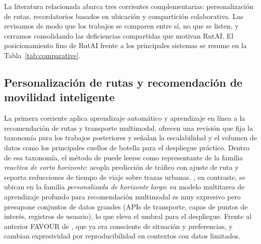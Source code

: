 \documentclass[a4paper,fleqn]{cas-sc}
\newcommand{\RUTAI}{RutAI\xspace}
\begin{document}
	La literatura relacionada abarca tres corrientes complementarias: personalizaci\'on de rutas, recordatorios basados en ubicaci\'on y compartici\'on colaborativa. Las revisamos de modo que los trabajos se comparen entre s\'i, no que se listen, y cerramos consolidando las deficiencias compartidas que motivan \RUTAI. El posicionamiento fino de \RUTAI frente a los principales sistemas se resume en la Tabla~\ref{tab:comparative}.
	
	\subsection{Personalizaci\'on de rutas y recomendaci\'on de movilidad inteligente}\label{sec:rw-routes}
	
	La primera corriente aplica aprendizaje autom\'atico y aprendizaje en l\'inea a la recomendaci\'on de rutas y transporte multimodal. \citet{yuan2022mlits} ofrecen una revisi\'on que fija la taxonom\'ia para los trabajos posteriores y se\~nalan la escalabilidad y el volumen de datos como los principales cuellos de botella para el despliegue pr\'actico. Dentro de esa taxonom\'ia, el m\'etodo de \citet{guo2021online} puede leerse como representante de la familia \emph{reactiva de corto horizonte}: acopla predicci\'on de tr\'afico con ajuste de ruta y reporta reducciones de tiempo de viaje sobre trazas urbanas. \citet{liu2022multimodal}, en contraste, se ubican en la familia \emph{personalizada de horizonte largo}: su modelo multitarea de aprendizaje profundo para recomendaci\'on multimodal es muy expresivo pero presupone conjuntos de datos grandes (APIs de transporte, capas de puntos de inter\'es, registros de usuario), lo que eleva el umbral para el despliegue. Frente al anterior FAVOUR de \citet{campigotto2017favour}, que ya era consciente de situaci\'on y preferencias, \citet{liu2022multimodal} y \citet{guo2021online} cambian expresividad por reproducibilidad en contextos con datos limitados.
	
\end{document}
